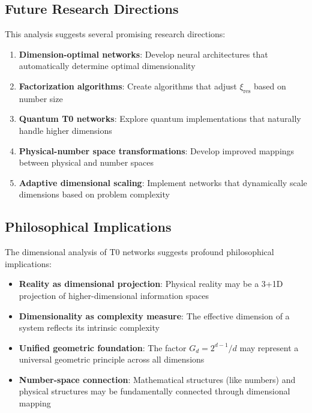 \documentclass[12pt,a4paper]{article}
\newcommand{\xipar}{\ensuremath{\xi}}
\begin{document}
	\subsection{Future Research Directions}
	\label{subsec:future_research}
	
	This analysis suggests several promising research directions:
	
	\begin{enumerate}
		\item \textbf{Dimension-optimal networks}: Develop neural architectures that automatically determine optimal dimensionality
		\item \textbf{Factorization algorithms}: Create algorithms that adjust $\xipar_{\text{res}}$ based on number size
		\item \textbf{Quantum T0 networks}: Explore quantum implementations that naturally handle higher dimensions
		\item \textbf{Physical-number space transformations}: Develop improved mappings between physical and number spaces
		\item \textbf{Adaptive dimensional scaling}: Implement networks that dynamically scale dimensions based on problem complexity
	\end{enumerate}
	
	\subsection{Philosophical Implications}
	\label{subsec:philosophical_implications}
	
	The dimensional analysis of T0 networks suggests profound philosophical implications:
	
	\begin{itemize}
		\item \textbf{Reality as dimensional projection}: Physical reality may be a 3+1D projection of higher-dimensional information spaces
		\item \textbf{Dimensionality as complexity measure}: The effective dimension of a system reflects its intrinsic complexity
		\item \textbf{Unified geometric foundation}: The factor $G_d = 2^{d-1}/d$ may represent a universal geometric principle across all dimensions
		\item \textbf{Number-space connection}: Mathematical structures (like numbers) and physical structures may be fundamentally connected through dimensional mapping
	\end{itemize}
	
\end{document}
